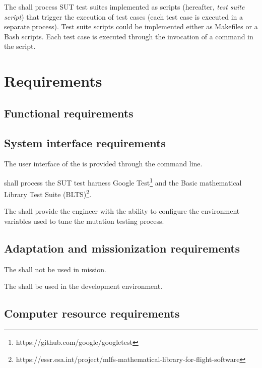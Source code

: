 \RQ{} The \FAQAS shall process SUT test suites implemented as scripts (hereafter, \emph{test suite script}) that trigger the execution of test cases (each test case is executed in a separate process). Test suite scripts could be implemented either as Makefiles or a Bash scripts. Each test case is executed through the invocation of a command in the script.



\chapter{Requirements}

\section{Functional requirements}
\label{sec:requirements}






\section{System interface requirements}

\RQ{} The user interface of the \FAQAS is provided through the command line.

\RQ{} \FAQAS shall process the SUT test harness Google Test\footnote{https://github.com/google/googletest} and the Basic mathematical Library Test Suite (BLTS)\footnote{https://essr.esa.int/project/mlfs-mathematical-library-for-flight-software}.

\RQ{} The \FAQAS shall provide the engineer with the ability to configure the environment variables used to tune the mutation testing process.



\section{Adaptation and missionization requirements}

\RQ{} The \FAQAS shall not be used in mission.

\RQ{} The \FAQAS shall be used in the development environment.




\section{Computer resource requirements}


